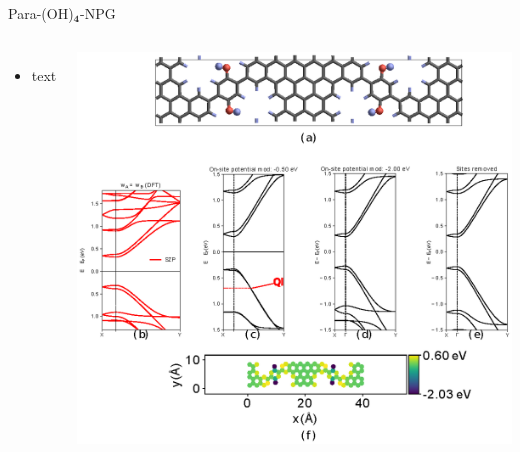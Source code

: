 \documentclass[hyperref={colorlinks=true,urlcolor=blue,linkcolor=.},aspectratio=1610,mathserif]{beamer}
\newcommand*\mathinhead[2]{\texorpdfstring{$\boldsymbol{#1}$}{#2}}
\begin{document}
\begin{frame}{Para-(OH)\mathinhead{_4}{_4}-NPG}
\centering
\begin{columns}[c]
    \begin{itemize}
        \item text
    \end{itemize}
    \includegraphics[width=\textwidth]{Figures/fig20.eps}
\end{columns}
\end{frame}
\end{document}
